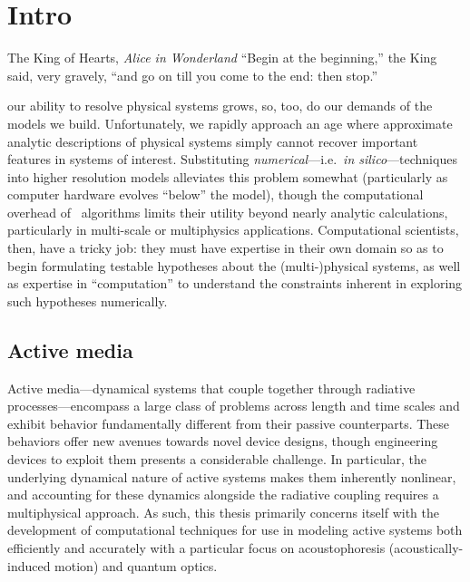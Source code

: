\chapter{\label{ch:intro}Intro}

\begin{frontquote}{The King of Hearts, \emph{Alice in Wonderland}}
``Begin at the beginning,'' the King said, very gravely, ``and go on till you come to the end: then stop.''
\end{frontquote}

 our ability to resolve physical systems grows, so, too, do our demands of the models we build.
Unfortunately, we rapidly approach an age where approximate analytic descriptions of physical systems simply cannot recover important features in systems of interest.
Substituting \emph{numerical}---i.e.\ \emph{in silico}---techniques into higher resolution models alleviates this problem somewhat (particularly as computer hardware evolves ``below'' the model), though the computational overhead of \naive\ algorithms limits their utility beyond nearly analytic calculations, particularly in multi-scale or multiphysics applications.
Computational scientists, then, have a tricky job: they must have expertise in their own domain so as to begin formulating testable hypotheses about the (multi-)physical systems, as well as expertise in ``computation'' to understand the constraints inherent in exploring such hypotheses numerically.

\section{Active media}

Active media---dynamical systems that couple together through radiative processes---encompass a large class of problems across length and time scales and exhibit behavior fundamentally different from their passive counterparts.
These behaviors offer new avenues towards novel device designs, though engineering devices to exploit them presents a considerable challenge.
In particular, the underlying dynamical nature of active systems makes them inherently nonlinear, and accounting for these dynamics alongside the radiative coupling requires a multiphysical approach.
As such, this thesis primarily concerns itself with the development of computational techniques for use in modeling active systems both efficiently and accurately with a particular focus on acoustophoresis (acoustically-induced motion) and quantum optics.

